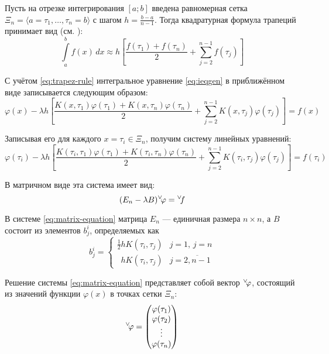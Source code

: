 \documentclass{article}
\numberwithin{equation}{section}
\renewcommand{\phi}{\varphi}
\newcommand{\intl}{\int\limits}
\renewcommand{\vec}[1]{{}^{\vee}\negmedspace#1}
\begin{document}
Пусть на отрезке интегрирования $[a; b]$ введена равномерная сетка
$\Xi_n = \langle a = \tau_1, \dotsc, \tau_n = b \rangle$ с шагом
$h = \frac{b-a}{n-1}$. Тогда квадратурная формула трапеций принимает
вид (см. \cite{bakhvalov01}):
\begin{equation}
  \label{eq:trapez-rule}
  \intl_a^b{f(x)\,dx} \approx h \left [ \frac{f(\tau_1)+f(\tau_n)}{2} +
    \sum_{j=2}^{n-1} f(\tau_j) \right ]
\end{equation}

С учётом \eqref{eq:trapez-rule} интегральное уравнение
\eqref{eq:ieqgen} в приближённом виде записывается следующим образом:
\begin{equation*}
  \phi(x) - \lambda h \left[ 
    \frac{K(x,\tau_1) \phi(\tau_1) + 
      K(x,\tau_n) \phi(\tau_n)}{2} + 
    \sum_{j=2}^{n-1} K(x, \tau_{j}) \phi(\tau_{j}) 
  \right] = f(x)
\end{equation*}

Записывая его для каждого $x = \tau_i \in \Xi_n$, получим систему линейных
уравнений:
\begin{equation*}
  \phi(\tau_i) - \lambda h \left[ 
    \frac{K(\tau_i,\tau_1) \phi(\tau_1) + 
      K(\tau_i,\tau_n) \phi(\tau_n)}{2} + 
    \sum_{j=2}^{n-1} K(\tau_i, \tau_{j}) \phi(\tau_{j}) 
  \right] = f(\tau_i)
\end{equation*}

В матричном виде эта система имеет вид:
\begin{equation}
  \label{eq:matrix-equation}
  (E_n-\lambda B) \vec{\phi} = \vec{f}
\end{equation}

В системе \eqref{eq:matrix-equation} матрица $E_n$ — единичная размера
$n×n$, а $B$ состоит из элементов $b_j^i$, определяемых как
\begin{equation}
  \label{eq:B-matrix-element}
  b_j^i =
  \begin{cases}
    \frac{1}{2}hK(\tau_i, \tau_j) & j = 1,\, j = n \\
    \phantom{\frac{1}{2}} hK(\tau_i, \tau_j) & j = \overline{2,n-1}
  \end{cases}
\end{equation}

Решение системы \eqref{eq:matrix-equation} представляет собой вектор
$\vec{\phi}$, состоящий из значений функции $\phi(x)$ в точках сетки
$\Xi_n$:
\begin{equation}
  \label{eq:num-solution}
  \vec{\phi} = 
  \begin{pmatrix}
    \phi(\tau_1) \\
    \phi(\tau_2) \\
    \vdots \\
    \phi(\tau_n)
  \end{pmatrix}
\end{equation}
\end{document}
